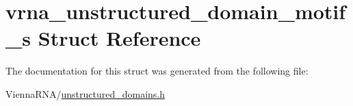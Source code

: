 \hypertarget{structvrna__unstructured__domain__motif__s}{}\section{vrna\+\_\+unstructured\+\_\+domain\+\_\+motif\+\_\+s Struct Reference}
\label{structvrna__unstructured__domain__motif__s}


The documentation for this struct was generated from the following file\+:\begin{DoxyCompactItemize}
\item 
Vienna\+R\+N\+A/\mbox{\hyperlink{unstructured__domains_8h}{unstructured\+\_\+domains.\+h}}\end{DoxyCompactItemize}
